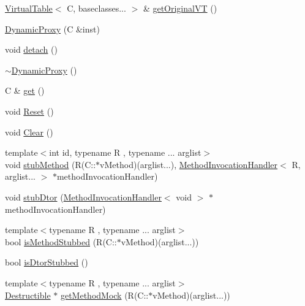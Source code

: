 \begin{DoxyCompactItemize}
\item 
\mbox{\hyperlink{structfakeit_1_1VirtualTable}{Virtual\+Table}}$<$ C, baseclasses... $>$ \& \mbox{\hyperlink{structfakeit_1_1DynamicProxy_aa34a496518156007196fd405dbf2e058}{get\+Original\+VT}} ()
\item 
\mbox{\hyperlink{structfakeit_1_1DynamicProxy_a417e0221b7df3845b201a9e4a1f5028b}{Dynamic\+Proxy}} (C \&inst)
\item 
void \mbox{\hyperlink{structfakeit_1_1DynamicProxy_a154f25eeeb36c0635d9209dd5870943e}{detach}} ()
\item 
\mbox{\hyperlink{structfakeit_1_1DynamicProxy_a05e9d9c1bcaf4bcd14d1b6311e16c809}{$\sim$\+Dynamic\+Proxy}} ()
\item 
C \& \mbox{\hyperlink{structfakeit_1_1DynamicProxy_af8e4100c2d995a26bf3209e68c11d12a}{get}} ()
\item 
void \mbox{\hyperlink{structfakeit_1_1DynamicProxy_a8f00dd7c68a247f715ec3925f662de9f}{Reset}} ()
\item 
void \mbox{\hyperlink{structfakeit_1_1DynamicProxy_a995c7e3dd97dc7707f18774eb4554b45}{Clear}} ()
\item 
{\footnotesize template$<$int id, typename R , typename ... arglist$>$ }\\void \mbox{\hyperlink{structfakeit_1_1DynamicProxy_ab1a98295698cf6eed3ff04ed4b838e51}{stub\+Method}} (R(C\+::$\ast$v\+Method)(arglist...), \mbox{\hyperlink{structfakeit_1_1MethodInvocationHandler}{Method\+Invocation\+Handler}}$<$ R, arglist... $>$ $\ast$method\+Invocation\+Handler)
\item 
void \mbox{\hyperlink{structfakeit_1_1DynamicProxy_a8ab5aa831398c6ee27cbdb12ee1f15cf}{stub\+Dtor}} (\mbox{\hyperlink{structfakeit_1_1MethodInvocationHandler}{Method\+Invocation\+Handler}}$<$ void $>$ $\ast$method\+Invocation\+Handler)
\item 
{\footnotesize template$<$typename R , typename ... arglist$>$ }\\bool \mbox{\hyperlink{structfakeit_1_1DynamicProxy_aeccdd2a03ebbf8eecc3291ebe6ccbfc4}{is\+Method\+Stubbed}} (R(C\+::$\ast$v\+Method)(arglist...))
\item 
bool \mbox{\hyperlink{structfakeit_1_1DynamicProxy_a6d3f0dfa93dc98b37fb50002bc4ea2bc}{is\+Dtor\+Stubbed}} ()
\item 
{\footnotesize template$<$typename R , typename ... arglist$>$ }\\\mbox{\hyperlink{classfakeit_1_1Destructible}{Destructible}} $\ast$ \mbox{\hyperlink{structfakeit_1_1DynamicProxy_a9774578f92b4d0258c72192dd16d6d0e}{get\+Method\+Mock}} (R(C\+::$\ast$v\+Method)(arglist...))

\end{DoxyCompactItemize}

